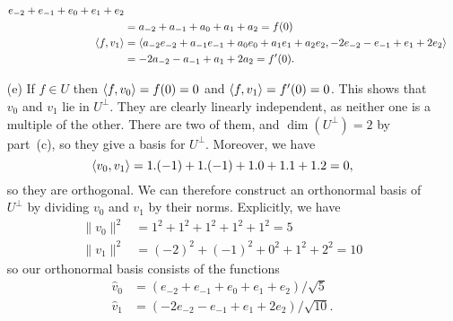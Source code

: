 \begin{itemize}
\begin{align*}
{                      e_{-2} + e_{-1} + e_0 + e_1 + e_2 } \\
               &= a_{-2} + a_{-1} + a_0 + a_1 + a_2 = f(0) \\
    \langle f,v_1\rangle &= \langle a_{-2}e_{-2}+a_{-1}e_{-1}+a_0e_0+a_1e_1+a_2e_2,
                      -2e_{-2} - e_{-1} + e_1 + 2 e_2 \rangle \\
               &= -2a_{-2} - a_{-1} + a_1 + 2 a_2 = f'(0).
   \end{align*}
  \item[(e)] If $f\in U$ then $\langle f,v_0\rangle=f(0)=0$ and
   $\langle f,v_1\rangle=f'(0)=0$.  This shows that $v_0$ and $v_1$ lie in
   $U^\perp$.  They are clearly linearly independent, as neither one
   is a multiple of the other.  There are two of them, and
   $\dim(U^\perp)=2$ by part~(c), so they give a basis for $U^\perp$.
   Moreover, we have
   \[ \langle v_0,v_1\rangle = 1.(-1) + 1.(-1) + 1.0 + 1.1 + 1.2 = 0, \]
   so they are orthogonal.  We can therefore construct an orthonormal
   basis of $U^\perp$ by dividing $v_0$ and $v_1$ by their norms.
   Explicitly, we have
   \begin{align*}
    \|v_0\|^2 &= 1^2 + 1^2 + 1^2 + 1^2 + 1^2 = 5 \\
    \|v_1\|^2 &= (-2)^2 + (-1)^2 + 0^2 + 1^2 + 2^2 = 10
   \end{align*}
   so our orthonormal basis consists of the functions
   \begin{align*}
    \hat{v}_0 &= (e_{-2} + e_{-1} + e_0 + e_1 + e_2)/\sqrt{5} \\
    \hat{v}_1 &= (-2e_{-2} -e_{-1} + e_1 + 2e_2)/\sqrt{10}.
   \end{align*}
 \end{itemize}
\EndDeferredSolution

